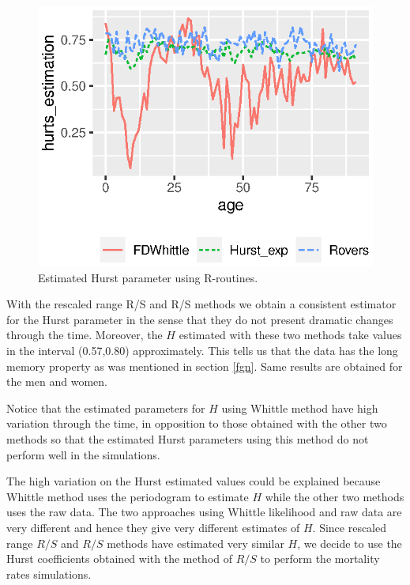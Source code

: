 \documentclass[smallextended]{svjour3}
\begin{document}
\begin{figure}[H]
    \centering
    \includegraphics{Hurst-Women.eps}
    \caption{Estimated Hurst parameter using R-routines.}
    \label{graph-Hurst_Est_Wo}
\end{figure}

With the rescaled range R/S and R/S  methods we obtain a consistent estimator
for the Hurst parameter in the sense that they do not present 
dramatic changes through the time. Moreover, the $H$ estimated with 
these two methods take values in the interval (0.57,0.80) approximately.
This tells us that the data has the long memory property as
was mentioned in section \ref{fgn}. Same results are obtained 
for the men and women.
%

Notice that the estimated parameters for $H$ using Whittle method have high
variation through the time, in opposition to those
obtained with the other two methods so that the estimated
Hurst parameters using this method do not perform well in the simulations.

The high variation on the Hurst estimated values could be explained because
Whittle method uses
the periodogram to estimate $H$ while the other two methods uses the raw data.
The two approaches using Whittle likelihood and raw data are very different and
hence they give very different estimates of $H$. Since rescaled range $R/S$ and
$R/S$  methods have estimated very similar $H$, we decide to use the Hurst
coefficients obtained with the method of $R/S$ to perform the mortality 
rates simulations.
\end{document}
